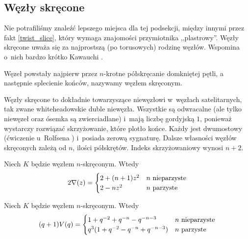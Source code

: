 
\subsection{Węzły skręcone}
%

Nie potrafiliśmy znaleźć lepszego miejsca dla tej podsekcji, między innymi przez fakt \ref{twist_slice}, który wymaga znajomości przymiotnika ,,plastrowy''.
Węzły skręcone uważa się za najprostszą (po torusowych) rodzinę węzłów.
Wspomina o~nich bardzo krótko Kawauchi \cite[s. 31]{kawauchi1996}.

\begin{definition}
    Węzeł powstały najpierw przez $n$-krotne półskręcanie domkniętej pętli, a następnie splecienie końców, nazywamy węzłem skręconym.
\end{definition}

Węzły skręcone to dokładnie towarzyszące niewęzłowi w~węzłach satelitarnych, tak zwane whiteheadowskie duble niewęzła.
Wszystkie są odwracalne (ale tylko niewęzeł oraz ósemka są zwierciadlane) i~mają liczbę gordyjską $1$, ponieważ wystarczy rozwiązać skrzyżowanie, które plotło końce.
%
Każdy jest dwumostowy (ćwiczenie u~Rolfsena \cite[s. 114]{rolfsen1976}) i~posiada zerową sygnaturę.
%
%
Dalsze własności węzłów skręconych zależą od $n$, ilości półskrętów.
Indeks skrzyżowaniowy wynosi $n + 2$.

\begin{proposition}
%
    Niech $K$ będzie węzłem $n$-skręconym.
    Wtedy
    \begin{equation}
    2 \nabla (z) = \begin{cases}
        2 + (n+1) z^{2} & n \mbox{ nieparzyste} \\
        2 - nz^2 & n \mbox{ parzyste}
    \end{cases}
    \end{equation}
\end{proposition}

\begin{proposition}
%
    Niech $K$ będzie węzłem $n$-skręconym.
    Wtedy
    \begin{equation}
    (q+1)V(q) = \begin{cases}
        1+q^{-2}+q^{-n}-q^{-n-3} & n \mbox{ nieparzyste} \\
        q^3(1+q^{-2}-q^{-n}+q^{-n-3}) & n \mbox{ parzyste}
    \end{cases}
    \end{equation}
\end{proposition}

